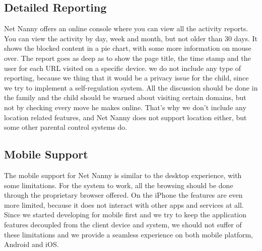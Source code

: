 \subsection{Detailed Reporting}

Net Nanny offers an online console where you can view all the activity reports. You can view the activity by day, week and month, but not older than 30 days. It shows the blocked content in a pie chart, with some more information on mouse over. The report goes as deep as to show the page title, the time stamp and the user for each URL visited on a specific device. we do not include any type of reporting, because we thing that it would be a privacy issue for the child, since we try to implement a self-regulation system. All the discussion should be done in the family and the child should be warned about visiting certain domains, but not by checking every move he makes online. That's why we don't include any location related features, and Net Nanny does not support location either, but some other parental control systems do.

\subsection{Mobile Support}

The mobile support for Net Nanny is similar to the desktop experience, with some limitations. For the system to work, all the browsing should be done through the proprietary browser offered. On the iPhone the features are even more limited, because it does not interact with other apps and services at all. Since we started developing for mobile first and we try to keep the application features decoupled from the client device and system, we should not suffer of these limitations and we provide a seamless experience on both mobile platform, Android and iOS. \parencite{netNannyPCMag}

